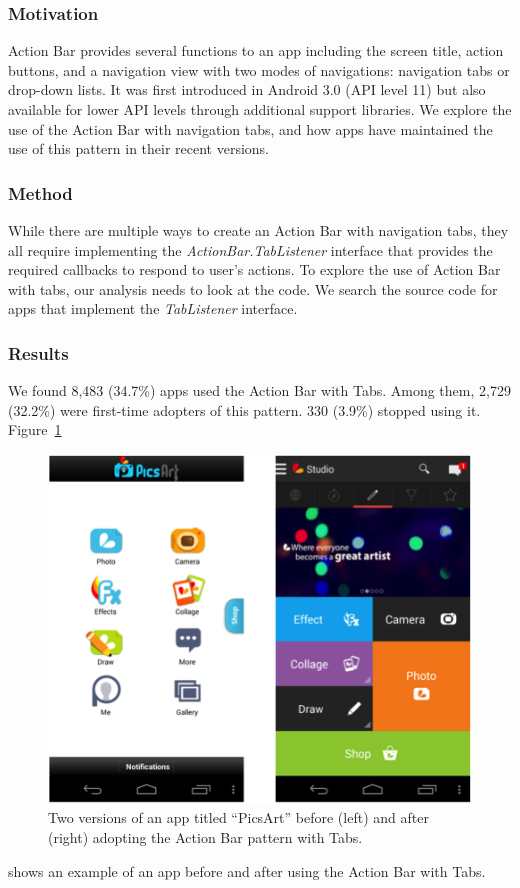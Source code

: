 \subsubsection{Motivation}
Action Bar provides several functions to an app including the screen title, action buttons, and a navigation view with two modes of navigations: navigation tabs or drop-down lists. 
It was first introduced in Android 3.0 (API level 11) but also available for lower API levels through additional support libraries. 
We explore the use of the Action Bar with navigation tabs, and how apps have maintained the use of this pattern in their recent versions.

\subsubsection{Method}
While there are multiple ways to create an Action Bar with navigation tabs, they all require implementing the \textit{ActionBar.TabListener} interface that provides the required callbacks to respond to user's actions. 
To explore the use of Action Bar with tabs, our analysis needs to look at the code. 
We search the source code for apps that implement the \textit{TabListener} interface.

\subsubsection{Results}
We found 8,483 (34.7\%) apps used the Action Bar with Tabs. 
Among them, 2,729 (32.2\%) were first-time adopters of this pattern. 330 (3.9\%) stopped using it. Figure~\ref{fig:fig_actiobar_tabs}
\begin{figure}[!t]
	\centering
	\includegraphics{figures/design-pattern-changes/actiobar_tabs}
	\caption{Two versions of an app titled ``PicsArt'' before (left) and after (right) adopting the Action Bar pattern with Tabs.}
	\label{fig:fig_actiobar_tabs}
\end{figure}
shows an example of an app before and after using the Action Bar with Tabs.


